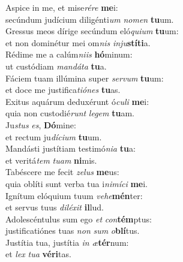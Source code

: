 \evenverse Aspice in me, et mise\textit{ré}\textit{re} \textbf{me}i:~\*\\
\evenverse secúndum judícium diligénti\textit{um} \textit{no}\textit{men} \textbf{tu}um.\\
\oddverse Gressus meos dírige secúndum eló\textit{qui}\textit{um} \textbf{tu}um:~\*\\
\oddverse et non dominétur mei om\textit{nis} \textit{in}\textit{ju}\textbf{stí}\textbf{ti}a.\\
\evenverse Rédime me a calúm\textit{ni}\textit{is} \textbf{hó}minum:~\*\\
\evenverse ut custódiam \textit{man}\textit{dá}\textit{ta} \textbf{tu}a.\\
\oddverse Fáciem tuam illúmina super \textit{ser}\textit{vum} \textbf{tu}um:~\*\\
\oddverse et doce me justifica\textit{ti}\textit{ó}\textit{nes} \textbf{tu}as.\\
\evenverse Exitus aquárum deduxérunt ó\textit{cu}\textit{li} \textbf{me}i:~\*\\
\evenverse quia non custodié\textit{runt} \textit{le}\textit{gem} \textbf{tu}am.\\
\oddverse Ju\textit{stus} \textit{es}, \textbf{Dó}mine:~\*\\
\oddverse et rectum ju\textit{dí}\textit{ci}\textit{um} \textbf{tu}um.\\
\evenverse Mandásti justítiam testimó\textit{ni}\textit{a} \textbf{tu}a:~\*\\
\evenverse et veritá\textit{tem} \textit{tu}\textit{am} \textbf{ni}mis.\\
\oddverse Tabéscere me fecit \textit{ze}\textit{lus} \textbf{me}us:~\*\\
\oddverse quia oblíti sunt verba tua i\textit{ni}\textit{mí}\textit{ci} \textbf{me}i.\\
\evenverse Ignítum elóquium tuum \textit{ve}\textit{he}\textbf{mén}ter:~\*\\
\evenverse et servus tuus \textit{di}\textit{lé}\textit{xit} \textbf{il}lud.\\
\oddverse Adolescéntulus sum ego \textit{et} \textit{con}\textbf{tém}ptus:~\*\\
\oddverse justificatiónes tuas \textit{non} \textit{sum} \textit{o}\textbf{blí}tus.\\
\evenverse Justítia tua, justítia \textit{in} \textit{æ}\textbf{tér}num:~\*\\
\evenverse et \textit{lex} \textit{tu}\textit{a} \textbf{vé}\textbf{ri}tas.\\
